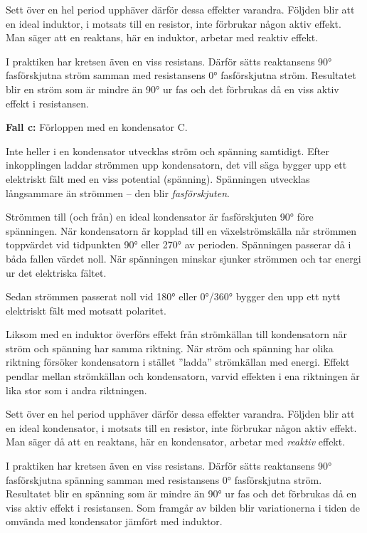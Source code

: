 Sett över en hel period upphäver därför dessa effekter varandra.
Följden blir att en ideal induktor, i motsats till en resistor, inte förbrukar
någon aktiv effekt.
Man säger att en reaktans, här en induktor, arbetar med reaktiv effekt.

I praktiken har kretsen även en viss resistans.
Därför sätts reaktansens \ang{90} fasförskjutna ström samman med resistansens
\ang{0} fasförskjutna ström.
Resultatet blir en ström som är mindre än \ang{90} ur fas och det förbrukas då
en viss aktiv effekt i resistansen.

\textbf{Fall c:} Förloppen med en kondensator C.

Inte heller i en kondensator utvecklas ström och spänning samtidigt.
Efter inkopplingen laddar strömmen upp kondensatorn, det vill säga bygger upp
ett elektriskt fält med en viss potential (spänning).
Spänningen utvecklas långsammare än strömmen -- den blir \emph{fasförskjuten}.

Strömmen till (och från) en ideal kondensator är fasförskjuten \ang{90} före
spänningen.
När kondensatorn är kopplad till en växelströmskälla når strömmen toppvärdet vid
tidpunkten \ang{90} eller \ang{270} av perioden.
Spänningen passerar då i båda fallen värdet noll.
När spänningen minskar sjunker strömmen och tar energi ur det elektriska fältet.

Sedan strömmen passerat noll vid \ang{180} eller \ang{0}/\ang{360} bygger den
upp ett nytt elektriskt fält med motsatt polaritet.

Liksom med en induktor överförs effekt från strömkällan till kondensatorn när
ström och spänning har samma riktning.
När ström och spänning har olika riktning försöker kondensatorn i stället
''ladda'' strömkällan med energi.
Effekt pendlar mellan strömkällan och kondensatorn, varvid effekten i
ena riktningen är lika stor som i andra riktningen.

Sett över en hel period upphäver därför dessa effekter varandra.
Följden blir att en ideal kondensator, i motsats till en resistor, inte
förbrukar någon aktiv effekt.
Man säger då att en reaktans, här en kondensator, arbetar med \emph{reaktiv}
effekt.

I praktiken har kretsen även en viss resistans.
Därför sätts reaktansens \ang{90} fasförskjutna spänning samman med
resistansens \ang{0} fasförskjutna ström.
Resultatet blir en spänning som är mindre än \ang{90} ur fas och det förbrukas
då en viss aktiv effekt i resistansen.
Som framgår av bilden blir variationerna i tiden de omvända med kondensator
jämfört med induktor.


